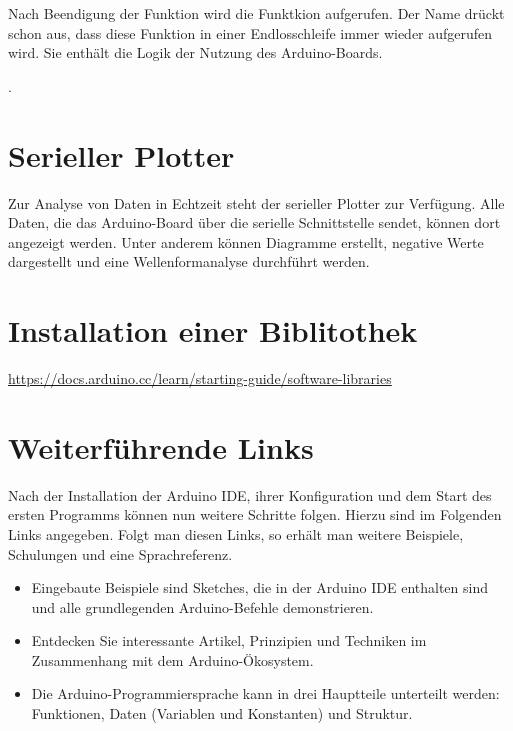  Nach Beendigung der Funktion  wird die Funktkion  aufgerufen. Der Name drückt schon aus, dass diese Funktion in einer Endlosschleife immer wieder aufgerufen wird. Sie enthält die Logik der Nutzung des Arduino-Boards.
 

.
\section{Serieller Plotter}

Zur Analyse von Daten in Echtzeit steht der serieller Plotter zur Verfügung. Alle Daten, die das Arduino-Board über die serielle Schnittstelle sendet, können dort angezeigt werden. Unter anderem können Diagramme erstellt, negative Werte dargestellt und eine Wellenformanalyse durchführt werden.




\section{Installation einer Biblitothek}\label{ArduinoIDELibInstall} \url{https://docs.arduino.cc/learn/starting-guide/software-libraries}


\section{Weiterführende Links}

Nach der Installation der Arduino IDE, ihrer Konfiguration und dem Start des ersten Programms können nun weitere Schritte folgen. Hierzu sind im Folgenden Links angegeben. Folgt man diesen Links, so erhält man weitere Beispiele, Schulungen und eine Sprachreferenz.


\begin{itemize}
	\item {}
	
	Eingebaute Beispiele sind Sketches, die in der Arduino IDE enthalten sind und alle grundlegenden Arduino-Befehle demonstrieren.
	
	\item {}
	
	Entdecken Sie interessante Artikel, Prinzipien und Techniken im Zusammenhang mit dem Arduino-Ökosystem.
	
	\item {}
	
	Die Arduino-Programmiersprache kann in drei Hauptteile unterteilt werden: Funktionen, Daten (Variablen und Konstanten) und Struktur.
\end{itemize}
